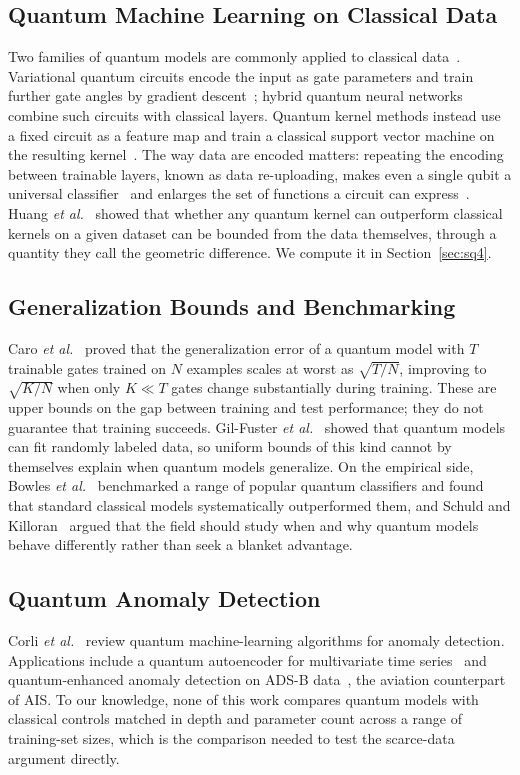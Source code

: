 \documentclass[journal]{IEEEtran}
\begin{document}
\subsection{Quantum Machine Learning on Classical Data}
Two families of quantum models are commonly applied to classical
data~\cite{biamonte2017qml}. Variational quantum circuits encode the input as
gate parameters and train further gate angles by gradient
descent~\cite{cerezo2021vqa}; hybrid quantum neural networks combine such
circuits with classical layers. Quantum kernel methods instead use a fixed
circuit as a feature map and train a classical support vector machine on the
resulting kernel~\cite{havlicek2019supervised}. The way data are encoded
matters: repeating the encoding between trainable layers, known as data
re-uploading, makes even a single qubit a universal
classifier~\cite{perezsalinas2020reuploading} and enlarges the set of functions
a circuit can express~\cite{schuld2021encoding}. Huang
\textit{et al.}~\cite{huang2021power} showed that whether any quantum kernel
can outperform classical kernels on a given dataset can be bounded from the
data themselves, through a quantity they call the geometric difference. We
compute it in Section~\ref{sec:sq4}.

\subsection{Generalization Bounds and Benchmarking}
Caro \textit{et al.}~\cite{caro2022generalization} proved that the
generalization error of a quantum model with $T$ trainable gates trained on $N$
examples scales at worst as $\sqrt{T/N}$, improving to $\sqrt{K/N}$ when only
$K \ll T$ gates change substantially during training. These are upper bounds on
the gap between training and test performance; they do not guarantee that
training succeeds. Gil-Fuster \textit{et al.}~\cite{gilfuster2024rethinking}
showed that quantum models can fit randomly labeled data, so uniform bounds of
this kind cannot by themselves explain when quantum models generalize. On the
empirical side, Bowles \textit{et al.}~\cite{bowles2024benchmarking}
benchmarked a range of popular quantum classifiers and found that standard
classical models systematically outperformed them, and Schuld and
Killoran~\cite{schuld2022advantage} argued that the field should study when and
why quantum models behave differently rather than seek a blanket advantage.

\subsection{Quantum Anomaly Detection}
Corli \textit{et al.}~\cite{corli2025anomaly} review quantum machine-learning
algorithms for anomaly detection. Applications include a quantum autoencoder
for multivariate time series~\cite{tscharke2025autoencoder} and quantum-enhanced
anomaly detection on ADS-B data~\cite{naaman2025adsb}, the aviation counterpart
of AIS. To our knowledge, none of this work compares quantum models with
classical controls matched in depth and parameter count across a range of
training-set sizes, which is the comparison needed to test the scarce-data
argument directly.
\end{document}
